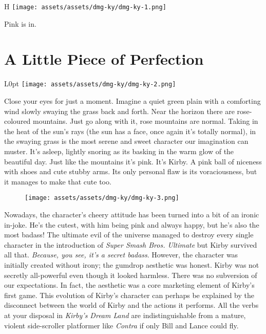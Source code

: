 \documentclass{book}
\begin{document}
\begin{wrapfigure}{H}{\linewidth}
\vskip 4pt
\centering \texttt{[image: assets/assets/dmg-ky/dmg-ky-1.png]}\par\pagetwodescription Pink is in.\end{wrapfigure}
\clearpage

\FloatBarrier\needspace{10mm}\section*{A Little Piece of Perfection}\nopagebreak[4]
\begin{wrapfigure}{L}{0pt} \texttt{[image: assets/assets/dmg-ky/dmg-ky-2.png]}\end{wrapfigure}
Close your eyes for just a moment. Imagine a quiet green plain with a comforting wind slowly swaying the grass back and forth. Near the horizon there are rose-coloured mountains. Just go along with it, rose mountains are normal. Taking in the heat of the sun’s rays (the sun has a face, once again it’s totally normal), in the swaying grass is the most serene and sweet character our imagination can muster. It’s asleep, lightly snoring as its basking in the warm glow of the beautiful day. Just like the mountains it’s pink. It’s Kirby. A pink ball of niceness with shoes and cute stubby arms. Its only personal flaw is its voraciousness, but it manages to make that cute too.

\begin{figure}[hbt]
\vskip 10pt
\centering \texttt{[image: assets/assets/dmg-ky/dmg-ky-3.png]}
\vskip 6pt
\end{figure}

Nowadays, the character’s cheery attitude has been turned into a bit of an ironic in-joke. He’s the cutest, with him being pink and always happy, but he’s also the most badass! The ultimate evil of the universe managed to destroy every single character in the introduction of \emph{Super Smash Bros. Ultimate} but Kirby survived all that. \emph{Because, you see, it’s a secret badass}. However, the character was initially created without irony; the gumdrop aesthetic was honest. Kirby was not secretly all-powerful even though it looked harmless. There was no subversion of our expectations. In fact, the aesthetic was a core marketing element of Kirby’s first game. This evolution of Kirby’s character can perhaps be explained by the disconnect between the world of Kirby and the actions it performs. All the verbs at your disposal in \emph{Kirby’s Dream Land} are indistinguishable from a mature, violent side-scroller platformer like \emph{Contra} if only Bill and Lance could fly.
\end{document}
